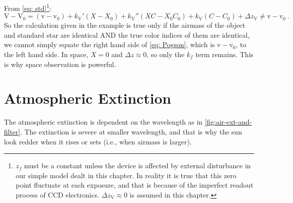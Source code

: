 
From \cref{eq: std}\footnote{$ z_{f} $ must be a constant unless the device is affected by external disturbance in our simple model dealt in this chapter. In reality it is true that this zero point fluctuate at each exposure, and that is because of the imperfect readout process of CCD electronics. $ \Delta z_\mathrm{V} \approx 0 $ is assumed in this chapter.}:
\begin{equation}
  \mathrm{V} - \mathrm{V}_0 
    = (\mathrm{v} - \mathrm{v}_0)
    + k_\mathrm{V}'(X - X_0)
    + k_\mathrm{V}''(X C - X_0 C_0)
    + k_\mathrm{V}(C - C_0)
    + \Delta z_\mathrm{V}
    \neq \mathrm{v} - \mathrm{v}_0 ~.
\end{equation}
So the calculation given in the example is true only if the airmass of the object and standard star are identical AND the true color indices of them are identical, we cannot simply equate the right hand side of \cref{eq: Pogson}, which is $ \mathrm{v} - \mathrm{v}_0 $, to the left hand side. In space, $ X = 0 $ and $ \Delta z \approx 0 $, so only the $ k_f $ term remains. This is why space observation is powerful.

\section{Atmospheric Extinction}
The atmospheric extinction is dependent on the wavelength as in \cref{fig:air-ext-and-filter}. The extinction is severe at smaller wavelength, and that is why the sun look redder when it rises or sets (i.e., when airmass is larger). 


